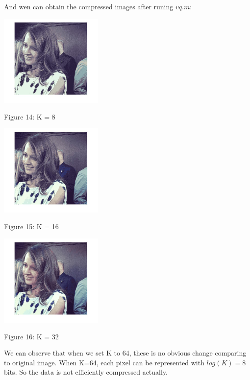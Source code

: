 \documentclass[11pt]{article} %
\begin{document}
And wen can obtain the compressed images after runing $vq.m$:

\begin{center}
\includegraphics[width=2in]{aa_8.jpg}  %

Figure 14: K = 8
\end{center}

\begin{center}
\includegraphics[width=2in]{aa_16.jpg}  %

Figure 15: K = 16
\end{center}

\begin{center}
\includegraphics[width=2in]{aa_32.jpg}  %

Figure 16: K = 32
\end{center}

We can observe that when we set K to 64, these is no obvious change comparing to original image. When K=64, each pixel can be represented with $log(K) = 8$ bits. So the data is not efficiently compressed actually.
\end{document}
